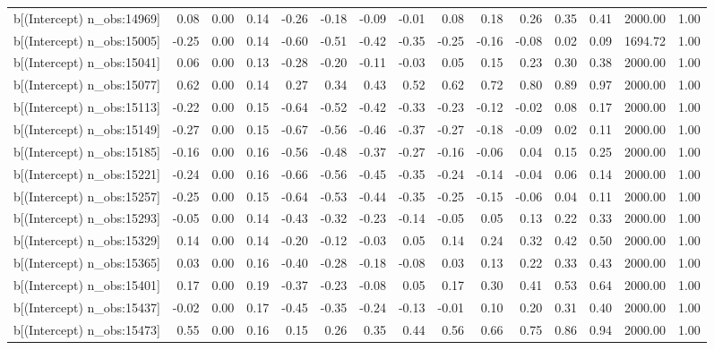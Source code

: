 \begin{table}[ht]
\begin{tabular}{rrrrrrrrrrrrrrr}
  b[(Intercept) n\_obs:14969] & 0.08 & 0.00 & 0.14 & -0.26 & -0.18 & -0.09 & -0.01 & 0.08 & 0.18 & 0.26 & 0.35 & 0.41 & 2000.00 & 1.00 \\ 
  b[(Intercept) n\_obs:15005] & -0.25 & 0.00 & 0.14 & -0.60 & -0.51 & -0.42 & -0.35 & -0.25 & -0.16 & -0.08 & 0.02 & 0.09 & 1694.72 & 1.00 \\ 
  b[(Intercept) n\_obs:15041] & 0.06 & 0.00 & 0.13 & -0.28 & -0.20 & -0.11 & -0.03 & 0.05 & 0.15 & 0.23 & 0.30 & 0.38 & 2000.00 & 1.00 \\ 
  b[(Intercept) n\_obs:15077] & 0.62 & 0.00 & 0.14 & 0.27 & 0.34 & 0.43 & 0.52 & 0.62 & 0.72 & 0.80 & 0.89 & 0.97 & 2000.00 & 1.00 \\ 
  b[(Intercept) n\_obs:15113] & -0.22 & 0.00 & 0.15 & -0.64 & -0.52 & -0.42 & -0.33 & -0.23 & -0.12 & -0.02 & 0.08 & 0.17 & 2000.00 & 1.00 \\ 
  b[(Intercept) n\_obs:15149] & -0.27 & 0.00 & 0.15 & -0.67 & -0.56 & -0.46 & -0.37 & -0.27 & -0.18 & -0.09 & 0.02 & 0.11 & 2000.00 & 1.00 \\ 
  b[(Intercept) n\_obs:15185] & -0.16 & 0.00 & 0.16 & -0.56 & -0.48 & -0.37 & -0.27 & -0.16 & -0.06 & 0.04 & 0.15 & 0.25 & 2000.00 & 1.00 \\ 
  b[(Intercept) n\_obs:15221] & -0.24 & 0.00 & 0.16 & -0.66 & -0.56 & -0.45 & -0.35 & -0.24 & -0.14 & -0.04 & 0.06 & 0.14 & 2000.00 & 1.00 \\ 
  b[(Intercept) n\_obs:15257] & -0.25 & 0.00 & 0.15 & -0.64 & -0.53 & -0.44 & -0.35 & -0.25 & -0.15 & -0.06 & 0.04 & 0.11 & 2000.00 & 1.00 \\ 
  b[(Intercept) n\_obs:15293] & -0.05 & 0.00 & 0.14 & -0.43 & -0.32 & -0.23 & -0.14 & -0.05 & 0.05 & 0.13 & 0.22 & 0.33 & 2000.00 & 1.00 \\ 
  b[(Intercept) n\_obs:15329] & 0.14 & 0.00 & 0.14 & -0.20 & -0.12 & -0.03 & 0.05 & 0.14 & 0.24 & 0.32 & 0.42 & 0.50 & 2000.00 & 1.00 \\ 
  b[(Intercept) n\_obs:15365] & 0.03 & 0.00 & 0.16 & -0.40 & -0.28 & -0.18 & -0.08 & 0.03 & 0.13 & 0.22 & 0.33 & 0.43 & 2000.00 & 1.00 \\ 
  b[(Intercept) n\_obs:15401] & 0.17 & 0.00 & 0.19 & -0.37 & -0.23 & -0.08 & 0.05 & 0.17 & 0.30 & 0.41 & 0.53 & 0.64 & 2000.00 & 1.00 \\ 
  b[(Intercept) n\_obs:15437] & -0.02 & 0.00 & 0.17 & -0.45 & -0.35 & -0.24 & -0.13 & -0.01 & 0.10 & 0.20 & 0.31 & 0.40 & 2000.00 & 1.00 \\ 
  b[(Intercept) n\_obs:15473] & 0.55 & 0.00 & 0.16 & 0.15 & 0.26 & 0.35 & 0.44 & 0.56 & 0.66 & 0.75 & 0.86 & 0.94 & 2000.00 & 1.00 \\ 

\end{tabular}
\end{table}
